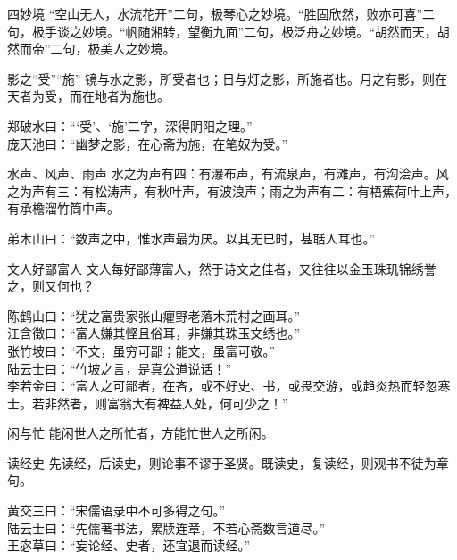 \begin{yulu}{四妙境}
“空山无人，水流花开”二句，极琴心之妙境。“胜固欣然，败亦可喜”二句，极手谈之妙境。“帆随湘转，望衡九面”二句，极泛舟之妙境。“胡然而天，胡然而帝”二句，极美人之妙境。
\begin{comments}

\end{comments}
\end{yulu}

\begin{yulu}{影之“受”“施”}
镜与水之影，所受者也；日与灯之影，所施者也。月之有影，则在天者为受，而在地者为施也。
\begin{comments}
郑破水曰：“‘受’、‘施’二字，深得阴阳之理。” \\
庞天池曰：“幽梦之影，在心斋为施，在笔奴为受。”
\end{comments}
\end{yulu}

\begin{yulu}{水声、风声、雨声}
水之为声有四：有瀑布声，有流泉声，有滩声，有沟浍声。风之为声有三：有松涛声，有秋叶声，有波浪声；雨之为声有二：有梧蕉荷叶上声，有承檐溜竹筒中声。
\begin{comments}
弟木山曰：“数声之中，惟水声最为厌。以其无已时，甚聒人耳也。”
\end{comments}
\end{yulu}

\begin{yulu}{文人好鄙富人}
文人每好鄙薄富人，然于诗文之佳者，又往往以金玉珠玑锦绣誉之，则又何也？
\begin{comments}
陈鹤山曰：“犹之富贵家张山癯野老落木荒村之画耳。” \\
江含徵曰：“富人嫌其悭且俗耳，非嫌其珠玉文绣也。” \\
张竹坡曰：“不文，虽穷可鄙；能文，虽富可敬。” \\
陆云士曰：“竹坡之言，是真公道说话！” \\
李若金曰：“富人之可鄙者，在吝，或不好史、书，或畏交游，或趋炎热而轻忽寒士。若非然者，则富翁大有裨益人处，何可少之！”
\end{comments}
\end{yulu}

\begin{yulu}{闲与忙}
能闲世人之所忙者，方能忙世人之所闲。
\begin{comments}

\end{comments}
\end{yulu}

\begin{yulu}{读经史}
先读经，后读史，则论事不谬于圣贤。既读史，复读经，则观书不徒为章句。
\begin{comments}
黄交三曰：“宋儒语录中不可多得之句。” \\
陆云士曰：“先儒著书法，累牍连章，不若心斋数言道尽。” \\
王宓草曰：“妄论经、史者，还宜退而读经。”
\end{comments}
\end{yulu}

